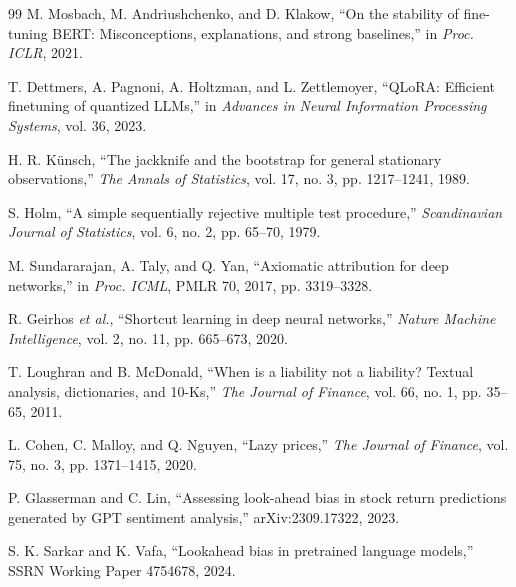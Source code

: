 \documentclass[11pt,a4paper]{article}
\begin{document}
\begin{thebibliography}{99}
 M. Mosbach, M. Andriushchenko, and D. Klakow, ``On the stability of fine-tuning BERT: Misconceptions, explanations, and strong baselines,'' in \emph{Proc. ICLR}, 2021.

 T. Dettmers, A. Pagnoni, A. Holtzman, and L. Zettlemoyer, ``QLoRA: Efficient finetuning of quantized LLMs,'' in \emph{Advances in Neural Information Processing Systems}, vol. 36, 2023.

 H. R. Künsch, ``The jackknife and the bootstrap for general stationary observations,'' \emph{The Annals of Statistics}, vol. 17, no. 3, pp. 1217--1241, 1989.

 S. Holm, ``A simple sequentially rejective multiple test procedure,'' \emph{Scandinavian Journal of Statistics}, vol. 6, no. 2, pp. 65--70, 1979.

 M. Sundararajan, A. Taly, and Q. Yan, ``Axiomatic attribution for deep networks,'' in \emph{Proc. ICML}, PMLR 70, 2017, pp. 3319--3328.

 R. Geirhos \emph{et al.}, ``Shortcut learning in deep neural networks,'' \emph{Nature Machine Intelligence}, vol. 2, no. 11, pp. 665--673, 2020.

 T. Loughran and B. McDonald, ``When is a liability not a liability? Textual analysis, dictionaries, and 10-Ks,'' \emph{The Journal of Finance}, vol. 66, no. 1, pp. 35--65, 2011.

 L. Cohen, C. Malloy, and Q. Nguyen, ``Lazy prices,'' \emph{The Journal of Finance}, vol. 75, no. 3, pp. 1371--1415, 2020.

 P. Glasserman and C. Lin, ``Assessing look-ahead bias in stock return predictions generated by GPT sentiment analysis,'' arXiv:2309.17322, 2023.

 S. K. Sarkar and K. Vafa, ``Lookahead bias in pretrained language models,'' SSRN Working Paper 4754678, 2024.

\end{thebibliography}
\end{document}
